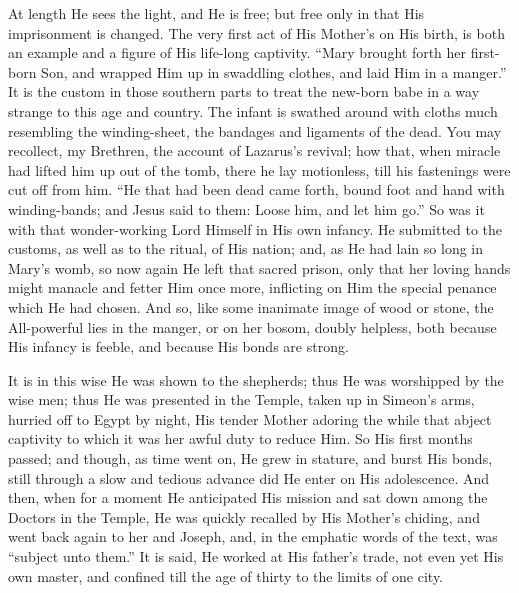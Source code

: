 At length He sees the light, and He is free; but free
only in that His imprisonment is changed. The very first
act of His Mother's on His birth, is both an example and
a figure of His life-long captivity. ``Mary brought
forth her first-born Son, and wrapped Him up in swaddling
clothes, and laid Him in a manger.'' It is the custom
in those southern parts to treat the new-born babe in a
way strange to this age and country. The infant is
swathed around with cloths much resembling the
winding-sheet, the bandages and ligaments of the dead.
You may recollect, my Brethren, the account of Lazarus's
revival; how that, when miracle had lifted him up out of
the tomb, there he lay motionless, till his fastenings
were cut off from him. ``He that had been dead came
forth, bound foot and hand with winding-bands; and Jesus
said to them: Loose him, and let him go.'' So was it
with that wonder-working Lord Himself in His own infancy.
He submitted to the customs, as well as to the ritual, of
His nation; and, as He had lain so long in Mary's womb,
so now again He left that sacred prison, only that her
loving hands might manacle and fetter Him once more,
inflicting on Him the special penance which He had
chosen. And so, like some inanimate image of wood or
stone, the All-powerful lies in the manger, or on her
bosom, doubly helpless, both because His infancy is
feeble, and because His bonds are strong.

It is in this wise He was shown to the shepherds; thus
He was worshipped by the wise men; thus He was presented
in the Temple, taken up in Simeon's arms, hurried off to
Egypt by night, His tender Mother adoring the while that
abject captivity to which it was her awful duty to reduce
Him. So His first months passed; and though, as time went
on, He grew in stature, and burst His bonds, still
through a slow and tedious advance did He enter on His
adolescence. And then, when for a moment He anticipated
His mission and sat down among the Doctors in the Temple,
He was quickly recalled by His Mother's chiding, and went
back again to her and Joseph, and, in the emphatic words
of the text, was ``subject unto them.'' It is
said, He worked at His father's trade, not even yet His
own master, and confined till the age of thirty to the
limits of one city.

